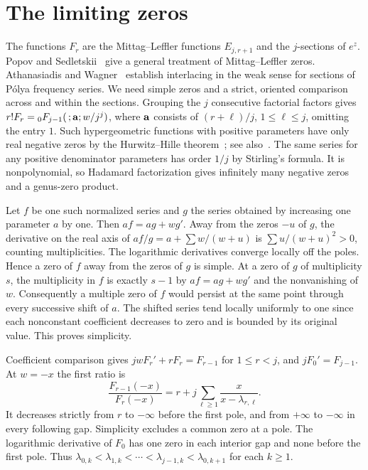 \documentclass[11pt]{amsart}
\begin{document}
\section{The limiting zeros}
The functions $F_r$ are the Mittag--Leffler functions $E_{j,r+1}$
and the $j$-sections of $e^z$. Popov and Sedletskii~\cite{ps} give
a general treatment of Mittag--Leffler zeros. Athanasiadis and
Wagner~\cite[Theorem 5.3 and Remark 5.4]{aw} establish interlacing
in the weak sense for sections of P\'olya frequency series. We need
simple zeros and a strict, oriented comparison across and within the
sections. Grouping the $j$ consecutive
factorial factors gives $r!F_r={}_0F_{j-1}(\,;{\bf a};w/j^j)$,
where ${\bf a}$ consists of $(r+\ell)/j$, $1\le\ell\le j$, omitting
the entry $1$. Such hypergeometric functions with positive parameters
have only real negative zeros by the Hurwitz--Hille
theorem~\cite[Theorem 1]{sokal}; see also~\cite[Theorem 2]{baricz}.
The same series
for any positive denominator parameters has order $1/j$ by Stirling's
formula. It is nonpolynomial, so Hadamard factorization gives infinitely
many negative zeros and a genus-zero product.

Let $f$ be one such normalized series and $g$ the series obtained by
increasing one parameter $a$ by one. Then $af=ag+wg'$. Away from the
zeros $-u$ of $g$, the derivative on the real axis of
$af/g=a+\sum w/(w+u)$ is $\sum u/(w+u)^2>0$, counting multiplicities.
The logarithmic derivatives converge locally off the poles. Hence a zero
of $f$ away from the zeros of $g$ is simple. At a zero of $g$ of
multiplicity $s$, the multiplicity in $f$ is exactly $s-1$ by
$af=ag+wg'$ and the nonvanishing of $w$. Consequently a multiple zero
of $f$ would persist at the same point through every successive shift of
$a$. The shifted series tend locally uniformly to one since each
nonconstant coefficient decreases to zero and is bounded by its
original value. This proves simplicity.

Coefficient comparison gives $jwF_r'+rF_r=F_{r-1}$ for $1\le r<j$,
and $jF_0'=F_{j-1}$. At $w=-x$ the first ratio is
\[
 \frac{F_{r-1}(-x)}{F_r(-x)}
 =r+j\sum_{\ell\ge1}\frac{x}{x-\lambda_{r,\ell}} .
\]
It decreases strictly from $r$ to $-\infty$ before the first pole,
and from $+\infty$ to $-\infty$ in every following gap.
Simplicity excludes a common zero at a pole. The logarithmic derivative
of $F_0$ has one zero in each interior gap and none before the first pole.
Thus $\lambda_{0,k}<\lambda_{1,k}<\cdots<
\lambda_{j-1,k}<\lambda_{0,k+1}$ for each $k\ge1$.
\end{document}
